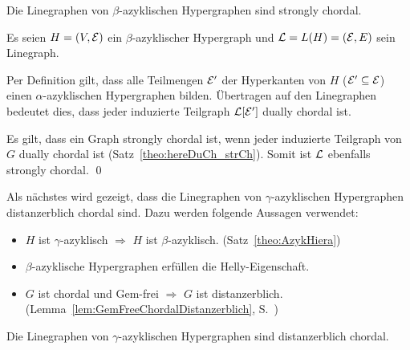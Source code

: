 \begin{Theorem}\label{theo:BetaLineStronglyChordal}
    Die Linegraphen von $\beta$-azyklischen Hypergraphen sind strongly chordal.
\end{Theorem}

\begin{Proof}
    Es seien $H=(V,\mathcal{E})$ ein $\beta$-azyklischer Hypergraph und $\mathcal{L}=L(H)=(\mathcal{E},E)$ sein Linegraph.
    
    Per Definition gilt, dass alle Teilmengen $\mathcal{E}'$ der Hyperkanten von $H$ ($\mathcal{E}' \subseteq \mathcal{E}$) einen $\alpha$-azyklischen Hypergraphen bilden. Übertragen auf den Linegraphen bedeutet dies, dass jeder induzierte Teilgraph $\mathcal{L}[\mathcal{E}']$ dually chordal ist.
    
    Es gilt, dass ein Graph strongly chordal ist, wenn jeder induzierte Teilgraph von $G$ dually chordal ist (Satz~\ref{theo:hereDuCh_strCh}). Somit ist $\mathcal{L}$ ebenfalls strongly chordal.
    \qed
\end{Proof}

Als nächstes wird gezeigt, dass die Linegraphen von $\gamma$-azyklischen Hypergraphen distanzerblich chordal sind. Dazu werden folgende Aussagen verwendet:

\begin{itemize}
    \item $H$ ist $\gamma$-azyklisch $\Rightarrow$ $H$ ist $\beta$-azyklisch. (Satz~\ref{theo:AzykHiera})
    \item $\beta$-azyklische Hypergraphen erfüllen die Helly-Eigenschaft. \cite{berge1989hypergraphs}
    \item $G$ ist chordal und Gem-frei $\Rightarrow$ $G$ ist distanzerblich. (Lemma~\ref{lem:GemFreeChordalDistanzerblich}, S.~\pageref{lem:GemFreeChordalDistanzerblich})
\end{itemize}

\begin{Theorem}\label{theo:GammaLineGrpah}
    Die Linegraphen von $\gamma$-azyklischen Hypergraphen sind distanzerblich chordal.
\end{Theorem}

